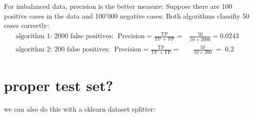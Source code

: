 \documentclass[letterpaper,10pt,english]{jupyterBook}
\begin{document}
\sphinxAtStartPar
For imbalanced data, precision is the better measure:
Suppose there are 100 positive cases in the data and 100’000 negative cases:
Both algorithms classifiy 50 cases correctly:
\label{equation:imbalanced_data:da4de55a-ce2b-4286-8fa4-0ba0a1c808b4}\begin{eqnarray}
\text{algorithm 1: 2000 false positives:  }\; \text{Precision}=\frac{\text{TP}}{\text{TP + FP}} = &\frac{50}{50 + 2000} = 0.0243\\
\text{algorithm 2:   200  false positives:  }\; \text{Precision}=\frac{\text{TP}}{\text{TP + FP}} = &\;\;\frac{50}{50 + 200} \;=\; 0.2
\end{eqnarray}
\begin{sphinxVerbatim}[commandchars=\\\{\}]
          
     
\end{sphinxVerbatim}


\chapter{proper test set?}
\label{\detokenize{imbalanced_data:proper-test-set}}
\sphinxAtStartPar
we can also do this with a sklearn data\sphinxhyphen{}set splitter:

\begin{sphinxVerbatim}[commandchars=\\\{\}]
   
    
   
  \PYG{p}{[}\PYG{p}{]}
  \PYG{p}{[}\PYG{p}{]}
\end{sphinxVerbatim}
\end{document}
